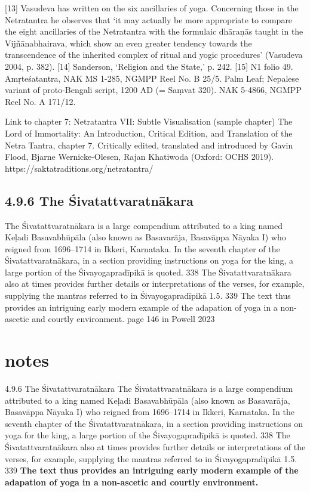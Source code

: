 [13] Vasudeva has written on the six ancillaries of yoga. Concerning those in the Netratantra he observes that ‘it may actually be more appropriate to compare the eight ancillaries of the Netratantra with the formulaic dhāraṇās taught in the Vijñānabhairava, which show an even greater tendency towards the transcendence of the inherited complex of ritual and yogic procedures’ (Vasudeva 2004, p. 382).
[14] Sanderson, ‘Religion and the State,’ p. 242.
[15] N1 folio 49. Amṛteśatantra, NAK MS 1-285, NGMPP Reel No. B 25/5. Palm Leaf; Nepalese variant of proto-Bengali script, 1200 AD (= Saṃvat 320). NAK 5-4866, NGMPP Reel No. A 171/12.

Link to chapter 7: Netratantra VII: Subtle Visualisation (sample chapter)
The Lord of Immortality: An Introduction, Critical Edition, and Translation of the Netra Tantra, chapter 7. Critically edited, translated and introduced by Gavin Flood, Bjarne Wernicke-Olesen, Rajan Khatiwoda (Oxford: OCHS 2019).
https://saktatraditions.org/netratantra/

\section{4.9.6 The Śivatattvaratnākara}
The Śivatattvaratnākara is a large compendium attributed to a king named Keḷadi Basavabhūpāla (also
known as Basavarāja, Basavāppa Nāyaka I) who reigned from 1696–1714 in Ikkeri, Karnataka. In the
seventh chapter of the Śivatattvaratnākara, in a section providing instructions on yoga for the king, a
large portion of the Śivayogapradīpikā is quoted. 338 The Śivatattvaratnākara also at times provides
further details or interpretations of the verses, for example, supplying the mantras referred to in
Śivayogapradīpikā 1.5. 339 The text thus provides an intriguing early modern example of the adapation of
yoga in a non-ascetic and courtly environment. page 146 in Powell 2023

\chapter{notes}
4.9.6 The Śivatattvaratnākara
The Śivatattvaratnākara is a large compendium attributed to a king named Keḷadi Basavabhūpāla (also
known as Basavarāja, Basavāppa Nāyaka I) who reigned from 1696–1714 in Ikkeri, Karnataka. In the
seventh chapter of the Śivatattvaratnākara, in a section providing instructions on yoga for the king, a
large portion of the Śivayogapradīpikā is quoted. 338 The Śivatattvaratnākara also at times provides
further details or interpretations of the verses, for example, supplying the mantras referred to in
Śivayogapradīpikā 1.5. 339 \textbf{The text thus provides an intriguing early modern example of the adapation of
yoga in a non-ascetic and courtly environment.}

